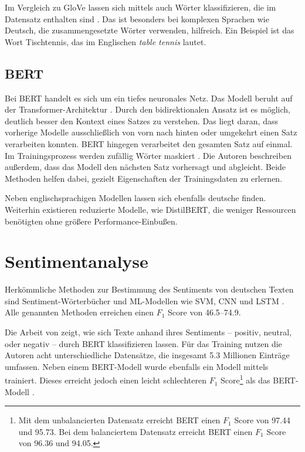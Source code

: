 Im Vergleich zu \ac{GloVe} lassen sich mittels \ft auch Wörter klassifizieren, die im Datensatz enthalten sind \autocite{guhr_training_2020, bojanowski_enriching_2017}. Das ist besonders bei komplexen Sprachen wie Deutsch, die zusammengesetzte Wörter verwenden, hilfreich. Ein Beispiel ist das Wort Tischtennis, das im Englischen \textit{table tennis} lautet.

\subsection*{BERT}

Bei \ac{BERT} handelt es sich um ein tiefes neuronales Netz. Das Modell beruht auf der Transformer-Architektur \autocite[3]{devlin_bert_2019}. Durch den bidirektionalen Ansatz ist es möglich, deutlich besser den Kontext eines Satzes zu verstehen. Das liegt daran, dass vorherige Modelle ausschließlich von vorn nach hinten oder umgekehrt einen Satz verarbeiten konnten. \ac{BERT} hingegen verarbeitet den gesamten Satz auf einmal. Im Trainingsprozess werden zufällig Wörter maskiert \autocite[4]{devlin_bert_2019}. Die Autoren beschreiben außerdem, dass das Modell den nächsten Satz vorhersagt und abgleicht. Beide Methoden helfen dabei, gezielt Eigenschaften der Trainingsdaten zu erlernen.

Neben englischsprachigen Modellen lassen sich ebenfalls deutsche finden. Weiterhin existieren reduzierte Modelle, wie DistilBERT, die weniger Ressourcen benötigten ohne größere Performance-Einbußen. 

\section{Sentimentanalyse} \label{sec:sentimentanalysis}

Herkömmliche Methoden zur Bestimmung des Sentiments von deutschen Texten sind Sentiment-Wörterbücher und \ac{ML}-Modellen wie \ac{SVM}, \ac{CNN} und \ac{LSTM} \autocite[1627\psq]{guhr_training_2020}. Alle genannten Methoden erreichen einen $F_1$ Score von \numrange{46.5}{74.9}.

Die Arbeit von \textcite{guhr_training_2020} zeigt, wie sich Texte anhand ihres Sentiments -- positiv, neutral, oder negativ -- durch \ac{BERT} klassifizieren lassen. Für das Training nutzen die Autoren acht unterschiedliche Datensätze, die insgesamt \num{5.3} Millionen Einträge umfassen. Neben einem \ac{BERT}-Modell wurde ebenfalls ein Modell mittels \ft trainiert. Dieses erreicht jedoch einen leicht schlechteren $F_1$ Score\footnote{Mit dem unbalancierten Datensatz erreicht \ac{BERT} einen $F_1$ Score von \num{97.44} und \ft \num{95.73}. Bei dem balanciertem Datensatz erreicht \ac{BERT} einen $F_1$ Score von \num{96.36} und \ft \num{94.05}.} als das \ac{BERT}-Modell \autocite[]{guhr_training_2020}.

